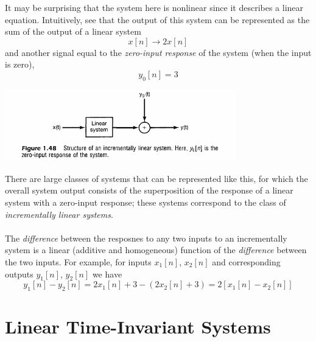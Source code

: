 \documentclass{report}
\begin{document}
It may be surprising that the system here is nonlinear since it describes a linear equation. Intuitively, see that the output
of this system can be represented as the sum of the output of a linear system
\begin{equation*}
x[n]\to2x[n]
\end{equation*}
and another signal equal to the \textit{zero-input
response} of the system (when the input is zero), 
\begin{equation*}
y_0[n]=3
\end{equation*}
\begin{center}
\includegraphics[width=10cm]{a15}
\end{center}
There are large classes of systems that can be represented like this, for which the overall system output
consists of the superposition of the response of a linear system with a zero-input response; these systems correspond to the class
of \textit{incrementally linear systems}.\\
\vspace{1mm}\\
The \textit{difference} between the resposnes to any two inputs to an incrementally system is a 
linear (additive and homogeneous) function of the \textit{difference} between the two inputs. For example, for inputs $x_1[n]$, 
$x_2[n]$ and corresponding outputs $y_1[n]$, $y_2[n]$ we have
\begin{equation*}
y_1[n]-y_2[n]=2x_1[n]+3-(2x_2[n]+3)=2[x_1[n]-x_2[n]]
\end{equation*}
\newpage

\section{Linear Time-Invariant Systems}
\end{document}
